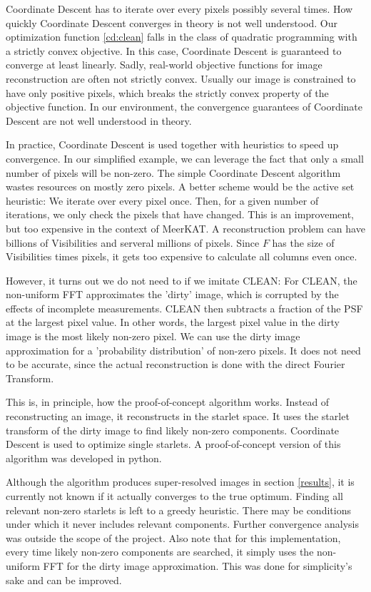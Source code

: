 Coordinate Descent has to iterate over every pixels possibly several times. How quickly Coordinate Descent converges in theory is not well understood. Our optimization function \eqref{cd:clean} falls in the class of quadratic programming with a strictly convex objective. In this case, Coordinate Descent is guaranteed to converge at least linearly\cite{luo1992convergence}. Sadly, real-world objective functions for image reconstruction are often not strictly convex. Usually our image is constrained to have only positive pixels\cite{mcewen2011compressed}, which breaks the strictly convex property of the objective function. In our environment, the convergence guarantees of Coordinate Descent are not well understood in theory.

In practice, Coordinate Descent is used together with heuristics to speed up convergence. In our simplified example, we can leverage the fact that only a small number of pixels will be non-zero. The simple Coordinate Descent algorithm wastes resources on mostly zero pixels. A better scheme would be the active set heuristic\cite{friedman2010regularization}: We iterate over every pixel once. Then, for a given number of iterations, we only check the pixels that have changed. This is an improvement, but too expensive in the context of MeerKAT. A reconstruction problem can have billions of Visibilities and serveral millions of pixels. Since $F$ has the size of Visibilities times pixels, it gets too expensive to calculate all columns even once.

However, it turns out we do not need to if we imitate CLEAN: For CLEAN, the non-uniform FFT approximates the 'dirty' image, which is corrupted by the effects of incomplete measurements. CLEAN then subtracts a fraction of the PSF at the largest pixel value. In other words, the largest pixel value in the dirty image is the most likely non-zero pixel. We can use the dirty image approximation for a 'probability distribution' of non-zero pixels. It does not need to be accurate, since the actual reconstruction is done with the direct Fourier Transform.

This is, in principle, how the proof-of-concept algorithm works. Instead of reconstructing an image, it reconstructs in the starlet space. It uses the starlet transform of the dirty image to find likely non-zero components. Coordinate Descent is used to optimize single starlets. A proof-of-concept version of this algorithm was developed in python.

Although the algorithm produces super-resolved images in section \ref{results}, it is currently not known if it actually converges to the true optimum. Finding all relevant non-zero starlets is left to a greedy heuristic. There may be conditions under which it never includes relevant components. Further convergence analysis was outside the scope of the project. Also note that for this implementation, every time likely non-zero components are searched, it simply uses the non-uniform FFT for the dirty image approximation. This was done for simplicity's sake and can be improved.


